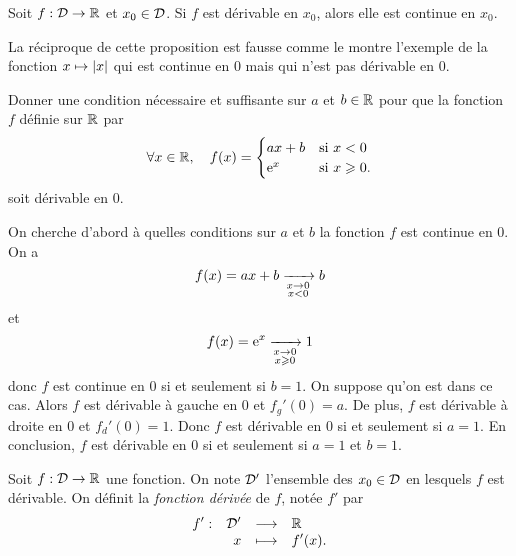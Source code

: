 \documentclass{magnolia}
\begin{document}
\begin{proposition}[utile=-3]
Soit $f:\mathcal{D}\to\mathbb{R}$ et $x_0\in\mathcal{D}$. Si $f$ est dérivable en $x_0$,
alors elle est continue en $x_0$.
\end{proposition}

\begin{remarqueUnique}
\remarque La réciproque de cette proposition est fausse comme le montre
  l'exemple de la fonction $x\mapsto\left|x\right|$ qui est continue en 0 mais
  qui n'est pas dérivable en 0.
\end{remarqueUnique}

\begin{exoUnique}
\exo Donner une condition nécessaire et suffisante sur $a$ et $b\in\mathbb{R}$
  pour que la fonction $f$ définie sur $\mathbb{R}$ par
  \[\forall x\in\mathbb{R} ,\quad f(x)=
    \begin{cases}
    ax+b & \text{si $x<0$}\\
    {\rm e}^x & \text{si $x\geqslant 0$}.
    \end{cases}\]
  soit dérivable en 0.
  \begin{sol}
On cherche d'abord à quelles conditions sur $a$ et $b$ la fonction $f$ est continue en 0. On a
\[f(x)=ax+b\xrightarrow[ \substack{x\rightarrow 0 \\ x<0}]{}b\]
et
\[f(x)={\rm e}^x\xrightarrow[ \substack{x\rightarrow 0 \\ x\geqslant 0}]{}1\]
donc $f$ est continue en 0 si et seulement si $b=1$. On suppose qu'on est dans ce cas. Alors $f$ est dérivable à gauche en 0 et $f_g'(0)=a$. De plus, $f$ est dérivable à droite en 0 et $f_d'(0)=1$. Donc $f$ est dérivable en 0 si et seulement si $a=1$. En conclusion, $f$ est dérivable en 0 si et seulement si $a=1$ et $b=1$. 
  \end{sol}
\end{exoUnique}

\begin{definition}[utile=-3]
Soit $f:\mathcal{D}\to\mathbb{R}$ une fonction. On note $\mathcal{D}'$ l'ensemble des $x_0\in\mathcal{D}$ en
lesquels $f$ est dérivable. On définit la \emph{fonction dérivée} de $f$, notée $f'$
par
\[\begin{array}[t]{lrcl} \displaystyle{f'} : & \displaystyle{\mathcal{D}'} & \longrightarrow & \displaystyle{\mathbb{R}} \\ & \displaystyle{x} & \longmapsto & \displaystyle{f'(x).} \end{array}\]
\end{definition}
\end{document}
